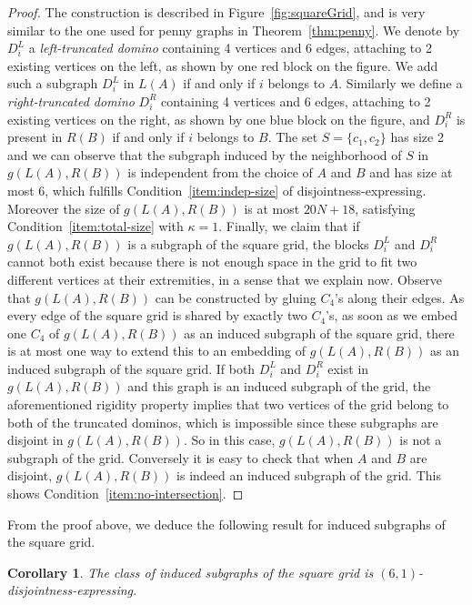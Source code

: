 \documentclass[a4paper,reqno, 12pt]{amsart}
\newtheorem{corollary}[theorem]{Corollary}
\newcommand{\formerepsilon}{\kappa}
\begin{document}
\begin{proof}
The construction is described  in Figure~\ref{fig:squareGrid}, and is very similar to the one used for penny
graphs in Theorem~\ref{thm:penny}. We denote by $D^L_i$ a
\emph{left-truncated domino} containing 4 vertices and 6 edges,
attaching to 2 existing vertices on the left, as shown by one red
block on the figure. We add such a subgraph $D^L_i$  in $L(A)$ if and
only if $i$  belongs to $A$. Similarly we define a
\emph{right-truncated domino} $D^R_i$  containing 4 vertices and 6 edges, attaching to 2 existing vertices on the right, as shown by one blue block on the figure, and $D^R_i$ is present in $R(B)$ if and only if $i$ belongs to $B$.
The set $S=\{c_1, c_2\}$ has size 2 and we can observe that the
subgraph induced by the neighborhood of $S$ in $g(L(A), R(B))$ is
independent from the choice of $A$ and $B$ and has size at most 6, which fulfills Condition~\ref{item:indep-size} of disjointness-expressing.
Moreover the size of $g(L(A), R(B))$ is at most $20N+18$, satisfying Condition~\ref{item:total-size} with $\formerepsilon=1$.
Finally, we claim that if $g(L(A), R(B))$ is a subgraph of the square
grid, the blocks $D^L_i$ and $D^R_i$ cannot both exist because there
is not enough space in the grid to fit two different vertices at their
extremities, in a sense that we explain now. Observe that $g(L(A),
R(B))$ can be constructed by gluing $C_4$'s along their edges. As
every edge of the square grid is shared by exactly two $C_4$'s, as
soon as we embed one $C_4$ of $g(L(A), R(B))$ as an induced
subgraph of the square grid, there is at most one way to extend this to
an embedding of $g(L(A), R(B))$  as an induced subgraph of the square grid.
If both $D^L_i$ and $D^R_i$ exist in $g(L(A), R(B))$ and this graph is
an induced subgraph of the grid, the aforementioned rigidity property implies that two vertices of the grid belong to both of the truncated dominos, which is impossible since these subgraphs are disjoint in $g(L(A), R(B))$. So in this case, $g(L(A), R(B))$ is not a subgraph of the grid. Conversely it is easy to check that when $A$ and $B$ are disjoint, $g(L(A), R(B))$ is indeed an induced subgraph of the grid. This shows Condition~\ref{item:no-intersection}.
\end{proof}

From the proof above, we deduce the following result for induced
subgraphs of the square grid.


\begin{corollary}\label{coro:induced subgraphs of squareGrid}
The class of induced subgraphs of the square grid is $(6, 1)$-disjointness-expressing.
\end{corollary}
\end{document}
